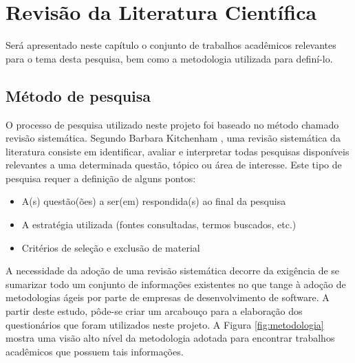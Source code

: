 \chapter{Revisão da Literatura Científica}
	Será apresentado neste capítulo o conjunto de trabalhos acadêmicos relevantes para o tema desta pesquisa, bem como a metodologia utilizada para definí-lo.
	\section{Método de pesquisa}
		O processo de pesquisa utilizado neste projeto foi baseado no método chamado revisão sistemática. Segundo Barbara Kitchenham \cite{Barbara04}, uma revisão sistemática da literatura consiste em identificar, avaliar e interpretar todas pesquisas disponíveis relevantes a uma determinada questão, tópico ou área de interesse. Este tipo de pesquisa requer a definição de alguns pontos:
		\begin{itemize}
			\item A(s) questão(ões) a ser(em) respondida(s) ao final da pesquisa
			\item A estratégia utilizada (fontes consultadas, termos buscados, etc.)
			\item Critérios de seleção e exclusão de material
		\end{itemize}
		A necessidade da adoção de uma revisão sistemática decorre da exigência de se sumarizar todo um conjunto de informações existentes no que tange à adoção de metodologias ágeis por parte de empresas de desenvolvimento de software. A partir deste estudo, pôde-se criar um arcabouço para a elaboração dos questionários que foram utilizados neste projeto. A Figura \ref{fig:metodologia} mostra uma visão alto nível da metodologia adotada para encontrar trabalhos acadêmicos que possuem tais informações.
